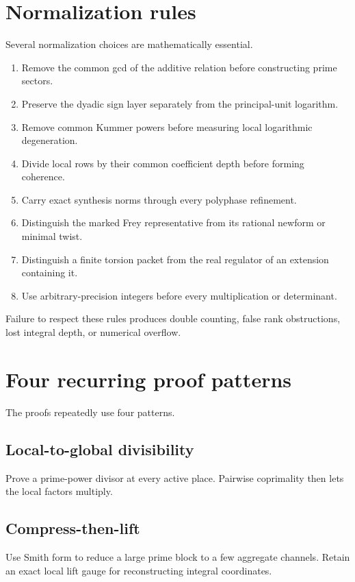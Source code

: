 \section{Normalization rules}
Several normalization choices are mathematically essential.

\begin{enumerate}[leftmargin=1.5em]
\item Remove the common gcd of the additive relation before constructing prime sectors.
\item Preserve the dyadic sign layer separately from the principal-unit logarithm.
\item Remove common Kummer powers before measuring local logarithmic degeneration.
\item Divide local rows by their common coefficient depth before forming coherence.
\item Carry exact synthesis norms through every polyphase refinement.
\item Distinguish the marked Frey representative from its rational newform or minimal twist.
\item Distinguish a finite torsion packet from the real regulator of an extension containing it.
\item Use arbitrary-precision integers before every multiplication or determinant.
\end{enumerate}

Failure to respect these rules produces double counting, false rank obstructions, lost integral depth, or numerical overflow.

\section{Four recurring proof patterns}
The proofs repeatedly use four patterns.

\subsection{Local-to-global divisibility}
Prove a prime-power divisor at every active place. Pairwise coprimality then lets the local factors multiply.

\subsection{Compress-then-lift}
Use Smith form to reduce a large prime block to a few aggregate channels. Retain an exact local lift gauge for reconstructing integral coordinates.

